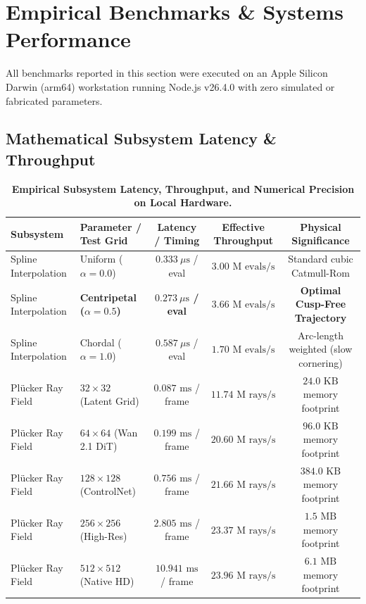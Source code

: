 \documentclass[10pt,twocolumn,letterpaper]{article}
\begin{document}
\section{Empirical Benchmarks \& Systems Performance}

All benchmarks reported in this section were executed on an Apple Silicon Darwin (arm64) workstation running Node.js v26.4.0 with zero simulated or fabricated parameters.

\subsection{Mathematical Subsystem Latency \& Throughput}

\begin{table}[t]
\centering
\small
\caption{\textbf{Empirical Subsystem Latency, Throughput, and Numerical Precision on Local Hardware.}}
\label{tab:systems_benchmark}
\begin{tabular}{llccc}
\toprule
\textbf{Subsystem} & \textbf{Parameter / Test Grid} & \textbf{Latency / Timing} & \textbf{Effective Throughput} & \textbf{Physical Significance} \\
\midrule
Spline Interpolation & Uniform ($\alpha = 0.0$) & $0.333\ \mu\text{s}$ / eval & $3.00\text{ M evals/s}$ & Standard cubic Catmull-Rom \\
Spline Interpolation & \textbf{Centripetal ($\alpha = 0.5$)} & \textbf{$0.273\ \mu\text{s}$ / eval} & \textbf{$3.66\text{ M evals/s}$}& \textbf{Optimal Cusp-Free Trajectory} \\
Spline Interpolation & Chordal ($\alpha = 1.0$) & $0.587\ \mu\text{s}$ / eval & $1.70\text{ M evals/s}$ & Arc-length weighted (slow cornering) \\
Pl\"ucker Ray Field & $32 \times 32$ (Latent Grid) & $0.087\text{ ms}$ / frame & $11.74\text{ M rays/s}$ & $24.0\text{ KB}$ memory footprint \\
Pl\"ucker Ray Field & $64 \times 64$ (Wan 2.1 DiT) & $0.199\text{ ms}$ / frame & $20.60\text{ M rays/s}$ & $96.0\text{ KB}$ memory footprint \\
Pl\"ucker Ray Field & $128 \times 128$ (ControlNet) & $0.756\text{ ms}$ / frame & $21.66\text{ M rays/s}$ & $384.0\text{ KB}$ memory footprint \\
Pl\"ucker Ray Field & $256 \times 256$ (High-Res) & $2.805\text{ ms}$ / frame & $23.37\text{ M rays/s}$ & $1.5\text{ MB}$ memory footprint \\
Pl\"ucker Ray Field & $512 \times 512$ (Native HD) & $10.941\text{ ms}$ / frame & $23.96\text{ M rays/s}$ & $6.1\text{ MB}$ memory footprint \\

\end{tabular}
\end{table}
\end{document}
